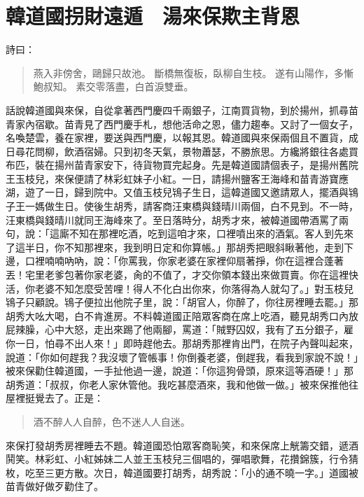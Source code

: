 
\chapter{韓道國拐財遠遁　湯來保欺主背恩}

詩曰：
\begin{quote}
燕入非傍舍，鷗歸只故池。
斷橋無復板，臥柳自生枝。
遂有山陽作，多慚鮑叔知。
素交零落盡，白首淚雙垂。
\end{quote}

話說韓道國與來保，自從拿著西門慶四千兩銀子，江南買貨物，到於揚州，抓尋苗青家內宿歇。苗青見了西門慶手札，想他活命之恩，儘力趨奉。又討了一個女子，名喚楚雲，養在家裡，要送與西門慶，以報其恩。韓道國與來保兩個且不置貨，成日尋花問柳，飲酒宿婦。只到初冬天氣，景物蕭瑟，不勝旅思。方纔將銀往各處買布匹，裝在揚州苗青家安下，待貨物買完起身。先是韓道國請個表子，是揚州舊院王玉枝兒，來保便請了林彩虹妹子小紅。一日，請揚州鹽客王海峰和苗青游寶應湖，遊了一日，歸到院中。又值玉枝兒鴇子生日，這韓道國又邀請眾人，擺酒與鴇子王一媽做生日。使後生胡秀，請客商汪東橋與錢晴川兩個，白不見到。不一時，汪東橋與錢晴川就同王海峰來了。至日落時分，胡秀才來，被韓道國帶酒罵了兩句，說：「這廝不知在那裡吃酒，吃到這咱才來，口裡噴出來的酒氣。客人到先來了這半日，你不知那裡來，我到明日定和你算帳。」那胡秀把眼斜瞅著他，走到下邊，口裡喃喃吶吶，說：「你罵我，你家老婆在家裡仰扇著掙，你在這裡合蓬著丟！宅里老爹包著你家老婆，肏的不值了，才交你領本錢出來做買賣。你在這裡快活，你老婆不知怎麼受苦哩！得人不化白出你來，你落得為人就勾了。」對玉枝兒鴇子只顧說。鴇子便拉出他院子里，說：「胡官人，你醉了，你往房裡睡去罷。」那胡秀大吆大喝，白不肯進房。不料韓道國正陪眾客商在席上吃酒，聽見胡秀口內放屁辣臊，心中大怒，走出來踢了他兩腳，罵道：「賊野囚奴，我有了五分銀子，雇你一日，怕尋不出人來！」即時趕他去。那胡秀那裡肯出門，在院子內聲叫起來，說道：「你如何趕我？我沒壞了管帳事！你倒養老婆，倒趕我，看我到家說不說！」被來保勸住韓道國，一手扯他過一邊，說道：「你這狗骨頭，原來這等酒硬！」那胡秀道：「叔叔，你老人家休管他。我吃甚麼酒來，我和他做一做。」被來保推他往屋裡挺覺去了。正是：
\begin{quote}
酒不醉人人自醉，色不迷人人自迷。
\end{quote}

來保打發胡秀房裡睡去不題。韓道國恐怕眾客商恥笑，和來保席上觥籌交錯，遞酒鬨笑。林彩虹、小紅姊妹二人並王玉枝兒三個唱的，彈唱歌舞，花攢錦簇，行令猜枚，吃至三更方散。次日，韓道國要打胡秀，胡秀說：「小的通不曉一字。」道國被苗青做好做歹勸住了。

